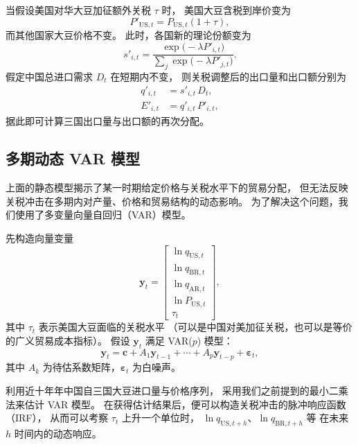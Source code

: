 \documentclass[12pt,a4paper]{ctexart} %
\begin{document}
当假设美国对华大豆加征额外关税 $\tau$ 时，
美国大豆含税到岸价变为
\begin{equation}
  P'_{\mathrm{US},t} = P_{\mathrm{US},t} (1+\tau),
\end{equation}
而其他国家大豆价格不变。
此时，各国新的理论份额变为
\begin{equation}
  s'_{i,t} = 
  \frac{\exp\big(-\lambda P'_{i,t}\big)}
       {\sum_{j} \exp\big(-\lambda P'_{j,t}\big)}.
\end{equation}
假定中国总进口需求 $D_t$ 在短期内不变，
则关税调整后的出口量和出口额分别为
\begin{align}
  q'_{i,t} &= s'_{i,t} \, D_t, \\
  E'_{i,t} &= q'_{i,t} \, P'_{i,t},
\end{align}
据此即可计算三国出口量与出口额的再次分配。

\subsection{多期动态 VAR 模型}

上面的静态模型揭示了某一时期给定价格与关税水平下的贸易分配，
但无法反映关税冲击在多期内对产量、价格和贸易结构的动态影响。
为了解决这个问题，我们使用了多变量向量自回归（VAR）模型。

先构造向量变量
\begin{equation}
  \mathbf{y}_t =
  \begin{bmatrix}
    \ln q_{\mathrm{US},t} \\
    \ln q_{\mathrm{BR},t} \\
    \ln q_{\mathrm{AR},t} \\
    \ln P_{\mathrm{US},t} \\
    \tau_t
  \end{bmatrix},
\end{equation}
其中 $\tau_t$ 表示美国大豆面临的关税水平
（可以是中国对美加征关税，也可以是等价的广义贸易成本指标）。
假设 $\mathbf{y}_t$ 满足 VAR($p$) 模型：
\begin{equation}
  \mathbf{y}_t = \mathbf{c}
  + A_1 \mathbf{y}_{t-1} + \cdots + A_p \mathbf{y}_{t-p}
  + \boldsymbol{\varepsilon}_t,
  \label{eq:var}
\end{equation}
其中 $A_k$ 为待估系数矩阵，$\boldsymbol{\varepsilon}_t$ 为白噪声。

利用近十年年中国自三国大豆进口量与价格序列，
采用我们之前提到的最小二乘法来估计 VAR 模型。
在获得估计结果后，便可以构造关税冲击的脉冲响应函数（IRF），
从而可以考察 $\tau_t$ 上升一个单位时，
$\ln q_{\mathrm{US},t+h}$、$\ln q_{\mathrm{BR},t+h}$ 等
在未来 $h$ 时间内的动态响应。
\end{document}
